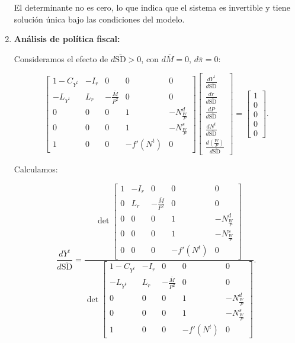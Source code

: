 \documentclass[
  doc,
  floatsintext,
  longtable,
  a4paper,
  nolmodern,
  notxfonts,
  notimes,
  colorlinks=true,linkcolor=blue,citecolor=blue,urlcolor=blue]{apa7}
\begin{document}
\begin{enumerate}
  El determinante no es cero, lo que indica que el sistema es invertible
  y tiene solución única bajo las condiciones del modelo.
\item
  \textbf{Análisis de política fiscal:}

  Consideramos el efecto de \(d\bar{\mathrm{SD}} > 0\), con
  \(d\bar{M} = 0\), \(d\bar{\pi} = 0\):

  \[
  \begin{bmatrix}
  1 - C_{Y^t} & -I_r & 0 & 0 & 0 \\
  -L_{Y^t} & L_r & -\frac{\bar{M}}{P^2} & 0 & 0 \\
  0 & 0 & 0 & 1 & -N^d_{\frac{W}{P}} \\
  0 & 0 & 0 & 1 & -N^s_{\frac{W}{P}} \\
  1 & 0 & 0 & -f'(N^t) & 0
  \end{bmatrix}
  \begin{bmatrix}
  \frac{dY^t}{d\bar{\mathrm{SD}}} \\
  \frac{dr}{d\bar{\mathrm{SD}}} \\
  \frac{dP}{d\bar{\mathrm{SD}}} \\
  \frac{dN^t}{d\bar{\mathrm{SD}}} \\
  \frac{d \left( \frac{W}{P} \right)}{d\bar{\mathrm{SD}}}
  \end{bmatrix}
  = \begin{bmatrix}
  1 \\
  0 \\
  0 \\
  0 \\
  0
  \end{bmatrix}.
  \]

  Calculamos:

  \[
  \frac{dY^t}{d\bar{\mathrm{SD}}} = \frac{\det \begin{bmatrix}
  1 & -I_r & 0 & 0 & 0 \\
  0 & L_r & -\frac{\bar{M}}{P^2} & 0 & 0 \\
  0 & 0 & 0 & 1 & -N^d_{\frac{W}{P}} \\
  0 & 0 & 0 & 1 & -N^s_{\frac{W}{P}} \\
  0 & 0 & 0 & -f'(N^t) & 0
  \end{bmatrix}}{\det \begin{bmatrix}
  1 - C_{Y^t} & -I_r & 0 & 0 & 0 \\
  -L_{Y^t} & L_r & -\frac{\bar{M}}{P^2} & 0 & 0 \\
  0 & 0 & 0 & 1 & -N^d_{\frac{W}{P}} \\
  0 & 0 & 0 & 1 & -N^s_{\frac{W}{P}} \\
  1 & 0 & 0 & -f'(N^t) & 0
  \end{bmatrix}}.
  \]


\end{enumerate}
\end{document}
